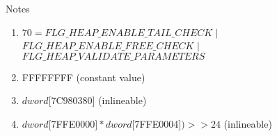 {\large Notes}
\begin{enumerate}
\item
$70 = ${\footnotesize $FLG\_HEAP\_ENABLE\_TAIL\_CHECK$} $|$ {\footnotesize $FLG\_HEAP\_ENABLE\_FREE\_CHECK$} $|$ {\footnotesize  $FLG\_HEAP\_VALIDATE\_PARAMETERS$}
\item
FFFFFFFF (constant value)
\item
$dword[$7C980380$]$ (inlineable)
\item
$dword [$7FFE0000$] * dword[$7FFE0004$]) >> 24$ (inlineable)
\end{enumerate}
\sig

